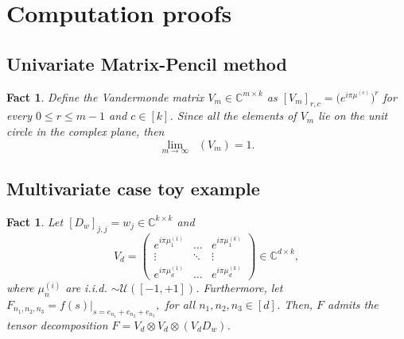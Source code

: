 \documentclass[11pt]{article}
\newtheorem{fact}[theorem]{Fact}
\DeclareMathOperator*{\cond}{cond_2}
\begin{document}
\section{Computation proofs}
\subsection{Univariate Matrix-Pencil method}
\begin{fact}
    Define the Vandermonde matrix $V_m\in\mathbb{C}^{m\times k}$ as $[V_m]_{r,c}=\big(e^{i\pi\mu^{(c)}}\big)^r$ for every $0\leq r\leq m-1$ and $c\in[k]$. Since all the elements of $V_m$ lie on the unit circle in the complex plane, then $$\lim_{m\to\infty}\cond(V_m)=1.$$
\end{fact}
\subsection{Multivariate case toy example}
\begin{fact}
    Let $[D_w]_{j,j}=w_j\in\mathbb{C}^{k\times k}$ and 
    \begin{equation}
        V_d=\begin{pmatrix}
            e^{i\pi\mu_1^{(1)}}&\ldots&e^{i\pi\mu_1^{(k)}}\\
            \vdots&\ddots&\vdots\\
            e^{i\pi\mu_d^{(1)}}&\ldots&e^{i\pi\mu_d^{(k)}}
        \end{pmatrix}\in\mathbb{C}^{d\times k},
        \label{eqn:Vd}
    \end{equation} where $\mu_n^{(i)}$ are i.i.d. $\sim\mathcal{U}([-1,+1])$. Furthermore, let $F_{n_1,n_2,n_3}=f(s)\big|_{s=e_{n_1}+e_{n_2}+e_{n_3}},$ for all $n_1,n_2,n_3\in[d]$. Then, $F$ admits the tensor decomposition $F=V_d\otimes V_d\otimes(V_dD_w)$.
\end{fact}
\end{document}

